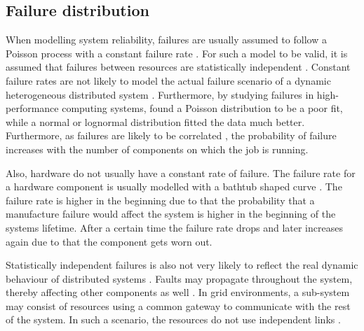 \documentclass{cslthse-msc}
\begin{document}
\subsection{Failure distribution}

When modelling system reliability, failures are usually assumed to follow a Poisson process with a constant failure rate \cite{algoMaxRelEndToEndConstraint} \cite{algoMinExTime} \cite{relModelDistSimSystem} \cite{optTaskAllocationForMaxRel} \cite{perfImplPerCheckPoint} \cite{optCheckpointInterval} \cite{realTimeSchedAlgo}. For such a model to be valid, it is assumed that failures between resources are statistically independent \cite{algoMaxRelEndToEndConstraint}. Constant failure rates are not likely to model the actual failure scenario of a dynamic heterogeneous distributed system \cite{algoMinExTime}. 
Furthermore, by studying failures in high-performance computing systems, \cite{studyOfFailures} found a Poisson distribution to be a poor fit, while a normal or lognormal distribution fitted the data much better. Furthermore, as failures are likely to be correlated \cite{perfImplPerCheckPoint}, the probability of failure increases with the number of components on which the job is running.

Also, hardware do not usually have a constant rate of failure. The failure rate for a hardware component is usually modelled with a bathtub shaped curve \cite{surveyReliabilityDistr}. The failure rate is higher in the beginning due to that the probability that a manufacture failure would affect the system is higher in the beginning of the systems lifetime. After a certain time the failure rate drops and later increases again due to that the component gets worn out.

Statistically independent failures is also not very likely to reflect the real dynamic behaviour of distributed systems \cite{surveyReliabilityDistr}  \cite{cloudServiceRel}. Faults may propagate throughout the system, thereby affecting other components as well \cite{relGridSystems}. In grid environments, a sub-system may consist of resources using a common gateway to communicate with the rest of the system. In such a scenario, the resources do not use independent links \cite{optResourceAllMaxPerformance}.
\end{document}
